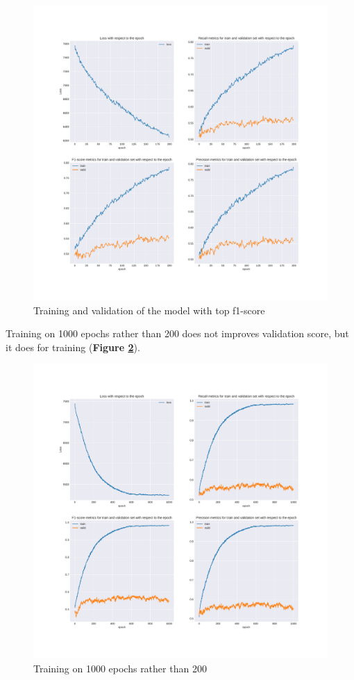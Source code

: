 \begin{figure}
	\centering
	\includegraphics[width=\textwidth]{images/chapitre4/attention-f1}
	\caption{Training and validation of the model with top f1-score}
	\label{fig:chap4:att3:f1}
\end{figure}

Training on 1000 epochs rather than 200 does not improves validation score, but it does for training (\textbf{Figure \ref{fig:chap4:att3:f1.1}}). \\

\begin{figure}
	\centering
	\includegraphics[width=\textwidth]{images/chapitre4/attention3}
	\caption{Training on 1000 epochs rather than 200}
	\label{fig:chap4:att3:f1.1}
\end{figure}

